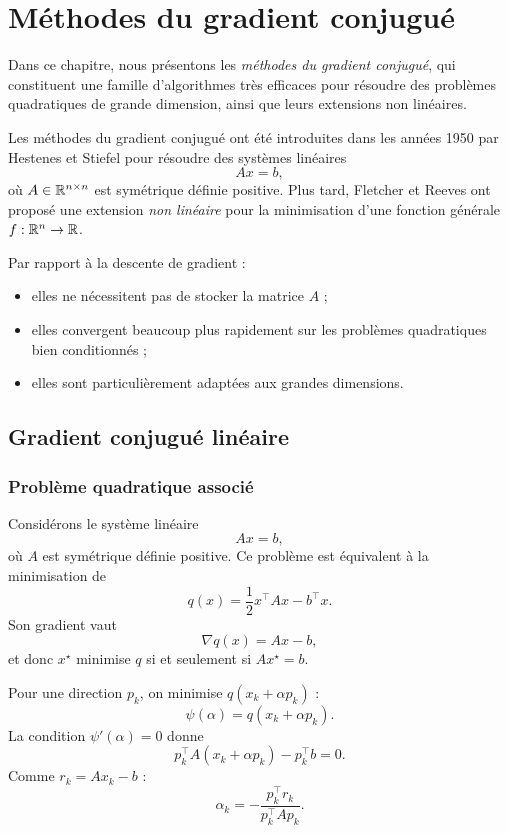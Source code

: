 \chapter{Méthodes du gradient conjugué}

Dans ce chapitre, nous présentons les \emph{méthodes du gradient conjugué},
qui constituent une famille d’algorithmes très efficaces pour résoudre
des problèmes quadratiques de grande dimension, ainsi que leurs
extensions non linéaires.

Les méthodes du gradient conjugué ont été introduites dans les années
1950 par Hestenes et Stiefel \cite{hestenes1952methods} pour résoudre des systèmes linéaires
\[
A x = b,
\]
où $A \in \mathbb{R}^{n \times n}$ est symétrique définie positive. Plus tard,
Fletcher et Reeves \cite{fletcher1964function} ont proposé une extension \emph{non linéaire} pour
la minimisation d’une fonction générale $f : \mathbb{R}^n \to \mathbb{R}$.

\medskip

Par rapport à la descente de gradient :
\begin{itemize}
  \item elles ne nécessitent pas de stocker la matrice $A$ ;
  \item elles convergent beaucoup plus rapidement sur les problèmes quadratiques bien conditionnés ;
  \item elles sont particulièrement adaptées aux grandes dimensions.
\end{itemize}

\section{Gradient conjugué linéaire}

\subsection{Problème quadratique associé}

Considérons le système linéaire
\[
A x = b,
\]
où $A$ est symétrique définie positive. Ce problème est équivalent à la minimisation de
\begin{equation}
q(x) = \frac{1}{2} x^\top A x - b^\top x.
\label{eq:cg-quadratic}
\end{equation}
Son gradient vaut
\[
\nabla q(x) = A x - b,
\]
et donc $x^\star$ minimise $q$ si et seulement si $A x^\star = b$.

Pour une direction $p_k$, on minimise $q(x_k + \alpha p_k)$ :
\[
\psi(\alpha) = q(x_k + \alpha p_k).
\]
La condition $\psi'(\alpha)=0$ donne
\[
p_k^\top A (x_k + \alpha p_k) - p_k^\top b = 0.
\]
Comme $r_k = A x_k - b$ :
\[
\boxed{\alpha_k = -\frac{p_k^\top r_k}{p_k^\top A p_k}}.
\]

